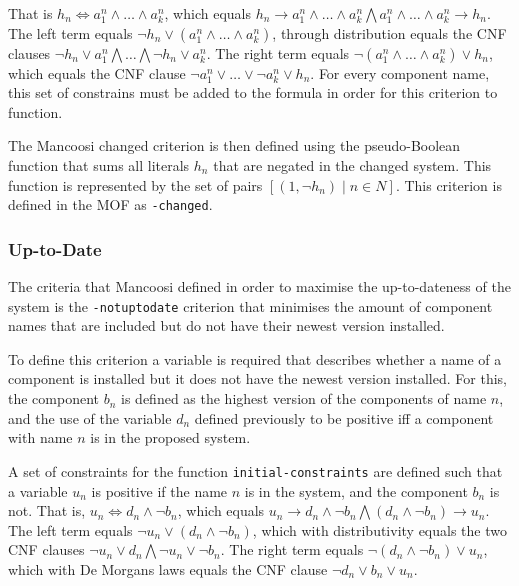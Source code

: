That is $h_n \Leftrightarrow a^n_1 \wedge \ldots \wedge a^n_k$, 
which equals $h_n \rightarrow a^n_1 \wedge \ldots \wedge a^n_k \bigwedge a^n_1 \wedge \ldots \wedge a^n_k \rightarrow h_n$.
The left term equals $\neg h_n  \vee (a^n_1 \wedge \ldots \wedge a^n_k)$,
through distribution equals the CNF clauses $\neg h_n \vee a^n_1 \bigwedge \ldots \bigwedge \neg h_n \vee a^n_k$.
The right term equals $\neg(a^n_1 \wedge \ldots \wedge a^n_k) \vee h_n$,
which equals the CNF clause $\neg a^n_1 \vee \ldots \vee \neg a^n_k \vee h_n$.
For every component name, this set of constrains must be added to the formula in order for this criterion to function.

\begin{defs}
The Mancoosi changed criterion is then defined using the pseudo-Boolean function
that sums all literals $h_n$ that are negated in the changed system. 
This function is represented by the set of pairs $[(1,\neg h_n) \mid n \in N]$.
This criterion is defined in the MOF as \verb+-changed+.
\end{defs}

\subsubsection{Up-to-Date}
The criteria that Mancoosi defined in order to maximise the up-to-dateness of the system is the \verb+-notuptodate+ 
criterion that minimises the amount of component names that are included but do not have their newest version installed.

To define this criterion a variable is required that describes whether a name of a component is installed but it does not have the newest version installed.
For this, the component $b_n$ is defined as the highest version of the components of name $n$,
and the use of the variable $d_n$ defined previously to be positive iff a component with name $n$ is in the proposed system.

A set of constraints for the function \verb+initial-constraints+ are defined
such that a variable $u_n$ is positive if the name $n$ is in the system, and the component $b_n$ is not.
That is, $u_n \Leftrightarrow d_n \wedge \neg b_n$, which equals
$u_n \rightarrow d_n \wedge \neg b_n \bigwedge (d_n \wedge \neg b_n) \rightarrow u_n$.
The left term equals $\neg u_n \vee (d_n \wedge \neg b_n)$, 
which with distributivity equals the two CNF clauses $\neg u_n \vee d_n \bigwedge \neg u_n \vee \neg b_n$.
The right term equals $\neg (d_n \wedge \neg b_n) \vee u_n$,
which with De Morgans laws equals the CNF clause $\neg d_n \vee b_n \vee u_n$. 

